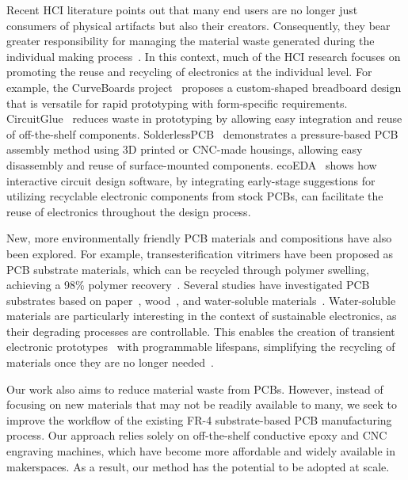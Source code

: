 Recent HCI literature points out that many end users are no longer just consumers of physical artifacts but also their creators. 
Consequently, they bear greater responsibility for managing the material waste generated during the individual making process~\cite{MakeMaking, lu2024unmaking}. 
In this context, much of the HCI research focuses on promoting the reuse and recycling of electronics at the individual level. For example, the CurveBoards project~\cite{10.1145/3313831.3376617} proposes a custom-shaped breadboard design that is versatile for rapid prototyping with form-specific requirements. 
CircuitGlue~\cite{lambrichts2023circuitgiue} reduces waste in prototyping by allowing easy integration and reuse of off-the-shelf components.
SolderlessPCB~\cite{10.1145/3613904.3642765} demonstrates a pressure-based PCB assembly method using 3D printed or CNC-made housings, allowing easy disassembly and reuse of surface-mounted components.
ecoEDA~\cite{10.1145/3586183.3606745} shows how interactive circuit design software, by integrating early-stage suggestions for utilizing recyclable electronic components from stock PCBs, can facilitate the reuse of electronics throughout the design process.

New, more environmentally friendly PCB materials and compositions have also been explored. For example, transesterification vitrimers have been proposed as PCB substrate materials, which can be recycled through polymer swelling, achieving a 98\% polymer recovery~\cite{zhang2024recyclable}. Several studies have investigated PCB substrates based on paper~\cite{10.1145/3381013, 10.1145/2493432.2493486, 10.1145/3173574.3174143}, wood~\cite{10.1145/3474349.3480191}, and water-soluble materials~\cite{bharath2020novel, 10.1145/3491101.3519823, 10.1145/3161165}. 
Water-soluble materials are particularly interesting in the context of sustainable electronics, as their degrading processes are controllable. 
This enables the creation of transient electronic prototypes~\cite{https://doi.org/10.1002/adfm.201301847, https://doi.org/10.1002/adma.201403164} with programmable lifespans, simplifying the recycling of materials once they are no longer needed~\cite{cheng2023functional, song2023vim, cheng2024recy}.

Our work also aims to reduce material waste from PCBs. However, instead of focusing on new materials that may not be readily available to many, we seek to improve the workflow of the existing FR-4 substrate-based PCB manufacturing process. Our approach relies solely on off-the-shelf conductive epoxy and CNC engraving machines, which have become more affordable and widely available in makerspaces. As a result, our method has the potential to be adopted at scale.




